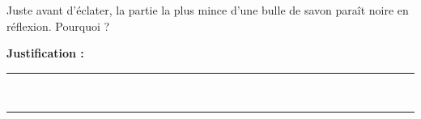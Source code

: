 Juste avant d'éclater, la partie la plus mince d'une bulle de savon paraît noire en réflexion. Pourquoi ?

\choices

\noindent\textbf{Justification :} \hrulefill \\[2.5ex]
\rule{\linewidth}{0.4pt} \\[2.5ex]
\rule{\linewidth}{0.4pt}
\vfill
